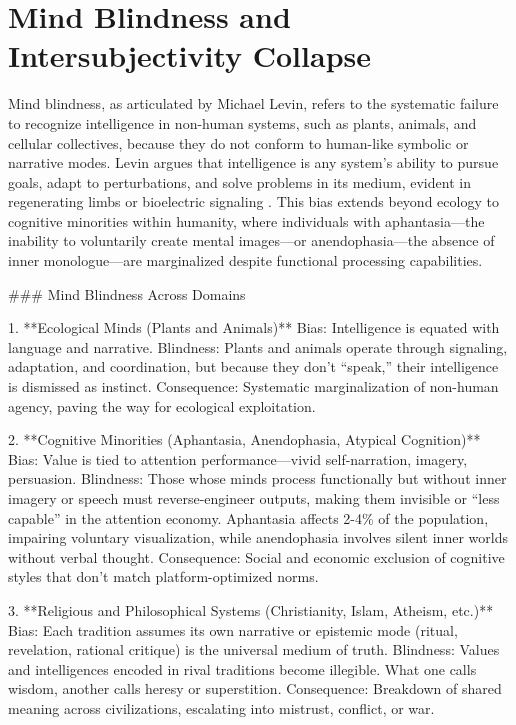 \documentclass{article}
\begin{document}
\section{Mind Blindness and Intersubjectivity Collapse}
\label{sec:mind_blindness}

Mind blindness, as articulated by Michael Levin, refers to the systematic failure to recognize intelligence in non-human systems, such as plants, animals, and cellular collectives, because they do not conform to human-like symbolic or narrative modes. Levin argues that intelligence is any system's ability to pursue goals, adapt to perturbations, and solve problems in its medium, evident in regenerating limbs or bioelectric signaling \citep{levin2019}. This bias extends beyond ecology to cognitive minorities within humanity, where individuals with aphantasia—the inability to voluntarily create mental images—or anendophasia—the absence of inner monologue—are marginalized despite functional processing capabilities.

### Mind Blindness Across Domains

1. **Ecological Minds (Plants and Animals)**  
   Bias: Intelligence is equated with language and narrative.  
   Blindness: Plants and animals operate through signaling, adaptation, and coordination, but because they don’t “speak,” their intelligence is dismissed as instinct.  
   Consequence: Systematic marginalization of non-human agency, paving the way for ecological exploitation.

2. **Cognitive Minorities (Aphantasia, Anendophasia, Atypical Cognition)**  
   Bias: Value is tied to attention performance—vivid self-narration, imagery, persuasion.  
   Blindness: Those whose minds process functionally but without inner imagery or speech must reverse-engineer outputs, making them invisible or “less capable” in the attention economy. Aphantasia affects 2-4\% of the population, impairing voluntary visualization, while anendophasia involves silent inner worlds without verbal thought.  
   Consequence: Social and economic exclusion of cognitive styles that don’t match platform-optimized norms.

3. **Religious and Philosophical Systems (Christianity, Islam, Atheism, etc.)**  
   Bias: Each tradition assumes its own narrative or epistemic mode (ritual, revelation, rational critique) is the universal medium of truth.  
   Blindness: Values and intelligences encoded in rival traditions become illegible. What one calls wisdom, another calls heresy or superstition.  
   Consequence: Breakdown of shared meaning across civilizations, escalating into mistrust, conflict, or war.
\end{document}
